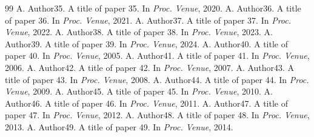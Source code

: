 \documentclass[twocolumn]{article}
\begin{document}
\begin{thebibliography}{99}
 A. Author35. A title of paper 35. In \emph{Proc. Venue}, 2020.
 A. Author36. A title of paper 36. In \emph{Proc. Venue}, 2021.
 A. Author37. A title of paper 37. In \emph{Proc. Venue}, 2022.
 A. Author38. A title of paper 38. In \emph{Proc. Venue}, 2023.
 A. Author39. A title of paper 39. In \emph{Proc. Venue}, 2024.
 A. Author40. A title of paper 40. In \emph{Proc. Venue}, 2005.
 A. Author41. A title of paper 41. In \emph{Proc. Venue}, 2006.
 A. Author42. A title of paper 42. In \emph{Proc. Venue}, 2007.
 A. Author43. A title of paper 43. In \emph{Proc. Venue}, 2008.
 A. Author44. A title of paper 44. In \emph{Proc. Venue}, 2009.
 A. Author45. A title of paper 45. In \emph{Proc. Venue}, 2010.
 A. Author46. A title of paper 46. In \emph{Proc. Venue}, 2011.
 A. Author47. A title of paper 47. In \emph{Proc. Venue}, 2012.
 A. Author48. A title of paper 48. In \emph{Proc. Venue}, 2013.
 A. Author49. A title of paper 49. In \emph{Proc. Venue}, 2014.
\end{thebibliography}
\end{document}
